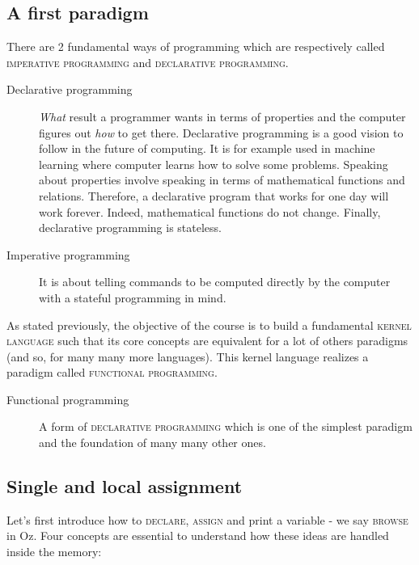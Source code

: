 \documentclass[11pt,a4paper,twoside,openright]{report}
\begin{document}
\subsection{A first paradigm}
There are 2 fundamental ways of programming which are respectively called 
\textsc{imperative programming} and \textsc{declarative programming}.

\begin{description}
 \item[Declarative programming] \textit{What} result a programmer wants in 
terms of properties and the computer figures out \textit{how} to get there. 
Declarative programming is a good vision to follow in the future of computing. 
It is for example used in machine learning where computer learns how to solve 
some problems. Speaking about properties involve speaking in terms of 
mathematical functions and relations. Therefore, a declarative program that 
works for one day will work forever. Indeed, mathematical functions do not 
change. Finally, declarative programming is stateless.
 \item[Imperative programming] It is about telling commands to be computed 
directly by the computer with a stateful programming in mind. 
\end{description}

As stated previously, the objective of the course is to build a fundamental 
\textsc{kernel language} such that its core concepts are equivalent for a lot of 
others paradigms (and so, for many many more languages). This kernel language 
realizes a paradigm called \textsc{functional programming}.

\begin{description}
 \item[Functional programming] A form of \textsc{declarative programming} which 
is one of the simplest paradigm and the foundation of many many other ones.
\end{description}

\subsection{Single and local assignment}
Let's first introduce how to \textsc{declare}, \textsc{assign} and print a 
variable - we say \textsc{browse} in Oz. Four concepts are essential to 
understand how these ideas are handled inside the memory:
\end{document}
